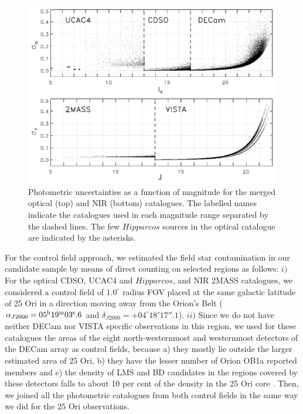 \documentclass[12pt]{article}
\begin{document}
\begin{figure}
	\begin{minipage}{0.60\textwidth}
		\includegraphics[width=1.00\textwidth]{errors_mix}
	\end{minipage} \hfill
	\begin{minipage}{0.35\textwidth}
		\caption[Photometric uncertainties of the catalogs used for the selection of member candidates.]{Photometric uncertainties as a function of magnitude for the merged optical (top) and NIR (bottom) catalogues. The labelled names indicate the catalogues used in each magnitude range separated by the dashed lines. The few $Hipparcos$ sources in the optical catalogue are indicated by the asterisks.}
		\label{fig_IMF:errors}
	\end{minipage}
\end{figure}

For the control field approach, we estimated the field star contamination in our candidate sample by means of direct counting on selected regions as follows: $i)$ For the optical CDSO, UCAC4 and $Hipparcos$, and NIR 2MASS catalogues, we considered a control field of $1.0^\circ$ radius FOV placed at the same galactic latitude of 25 Ori in a direction moving away from the Orion's Belt ($\alpha_{J2000}= 05^{\rm h} 19^{\rm m} 03^{\rm s}.6$ and $\delta_{J2000} = +04^{\circ} 18' 17''.1$). $ii)$ Since we do not have neither DECam nor VISTA specific observations in this region, we used for these catalogues the areas of the eight north-westernmost and westernmost detectors of the DECam array as control fields, because a) they mostly lie outside the larger estimated area of 25 Ori, b) they have the lesser number of Orion OB1a reported members \citep{Briceno2018,Kounkel2018} and c) the density of LMS and BD candidates in the regions covered by these detectors falls to about 10 per cent of the density in the 25 Ori core \citep{Downes2014}. Then, we joined all the photometric catalogues from both control fields in the same way we did for the 25 Ori observations.
\end{document}
